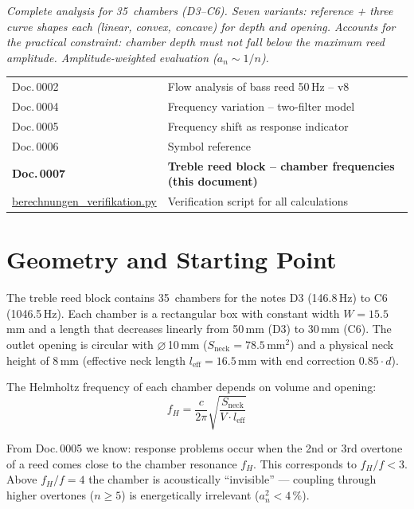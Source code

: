\documentclass[11pt,a4paper]{article}
\begin{document}
\hbmaketitle

{\small\itshape Complete analysis for 35~chambers (D3--C6). Seven variants: reference + three curve shapes each (linear, convex, concave) for depth and opening. Accounts for the practical constraint: chamber depth must not fall below the maximum reed amplitude. Amplitude-weighted evaluation ($a_n \sim 1/n$).}

\vspace{2mm}
\begin{center}\small
\begin{tabularx}{\textwidth}{l X}
\hbtoprule
Doc.\,0002 & Flow analysis of bass reed 50\,Hz -- v8 \\
Doc.\,0004 & Frequency variation -- two-filter model \\
Doc.\,0005 & Frequency shift as response indicator \\
Doc.\,0006 & Symbol reference \\
\textbf{Doc.\,0007} & \textbf{Treble reed block -- chamber frequencies (this document)} \\
\midrule
\href{berechnungen_verifikation.py}{berechnungen\_verifikation.py} & Verification script for all calculations \\
\bottomrule
\end{tabularx}
\end{center}
\vspace{4mm}

\section{Geometry and Starting Point}

The treble reed block contains 35~chambers for the notes D3 (146.8\,Hz) to C6 (1046.5\,Hz). Each chamber is a rectangular box with constant width $W = 15{.}5$\,mm and a length that decreases linearly from 50\,mm (D3) to 30\,mm (C6). The outlet opening is circular with $\varnothing$\,10\,mm ($S_\text{neck} = 78{.}5$\,mm$^2$) and a physical neck height of 8\,mm (effective neck length $l_\text{eff} = 16{.}5$\,mm with end correction $0{.}85 \cdot d$).

The Helmholtz frequency of each chamber depends on volume and opening:
\begin{equation}
f_H = \frac{c}{2\pi}\sqrt{\frac{S_\text{neck}}{V \cdot l_\text{eff}}}
\end{equation}

From Doc.\,0005 we know: response problems occur when the 2nd or 3rd overtone of a reed comes close to the chamber resonance $f_H$. This corresponds to $f_H/f < 3$. Above $f_H/f = 4$ the chamber is acoustically ``invisible'' --- coupling through higher overtones ($n \geq 5$) is energetically irrelevant ($a_n^2 < 4\,\%$).
\end{document}
